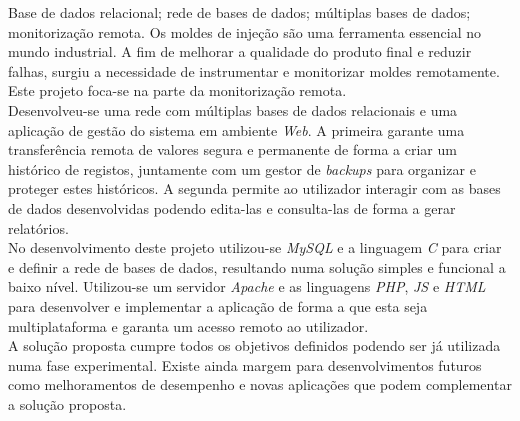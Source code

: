 \documentclass[11pt,twoside,a4paper]{report}
\begin{document}
\TitlePage
  \vspace*{55mm}
       {Base de dados relacional; rede de bases de dados; múltiplas bases de dados; monitorização remota.}
       {Os moldes de injeção são uma ferramenta essencial no mundo industrial. A fim de melhorar a qualidade do produto final e reduzir falhas, surgiu a necessidade de instrumentar e monitorizar moldes remotamente. Este projeto foca-se na parte da monitorização remota.\\
       Desenvolveu-se uma rede com múltiplas bases de dados relacionais e uma aplicação de gestão do sistema em ambiente \textit{Web}. A primeira garante uma transferência remota de valores segura e permanente de forma a criar um histórico de registos, juntamente com um gestor de \textit{backups} para organizar e proteger estes históricos. A segunda permite ao utilizador interagir com as bases de dados desenvolvidas podendo edita-las e consulta-las de forma a gerar relatórios.\\
       No desenvolvimento deste projeto utilizou-se \textit{MySQL} e a linguagem \textit{C} para criar e definir a rede de bases de dados, resultando numa solução simples e funcional a baixo nível. Utilizou-se um servidor \textit{Apache} e as linguagens \textit{PHP}, \textit{JS} e \textit{HTML} para desenvolver e implementar a aplicação de forma a que esta seja multiplataforma e garanta um acesso remoto ao utilizador.\\
       A solução proposta cumpre todos os objetivos definidos podendo ser já utilizada numa fase experimental. Existe ainda margem para desenvolvimentos futuros como melhoramentos de desempenho e novas aplicações que podem complementar a solução proposta.}
\EndTitlePage
\titlepage\ \endtitlepage %
\end{document}
